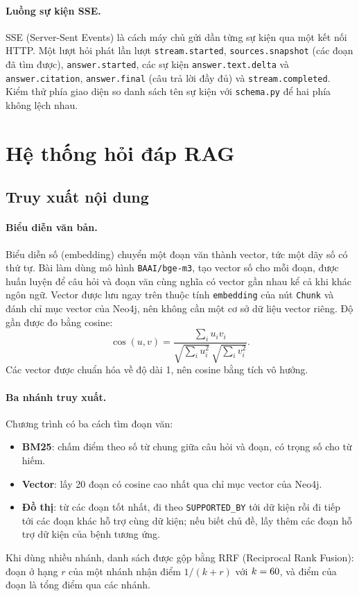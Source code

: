 \documentclass[11pt,a4paper]{article}
\begin{document}
\paragraph{Luồng sự kiện SSE.}
SSE (Server-Sent Events) là cách máy chủ gửi dần từng sự kiện qua một kết nối HTTP. Một lượt hỏi phát lần lượt
\texttt{stream.started}, \texttt{sources.snapshot} (các đoạn đã tìm được), \texttt{answer.started}, các sự kiện
\texttt{answer.text.delta} và \texttt{answer.citation}, \texttt{answer.final} (câu trả lời đầy đủ) và
\texttt{stream.completed}. Kiểm thử phía giao diện so danh sách tên sự kiện với \texttt{schema.py} để hai phía
không lệch nhau.

\section{Hệ thống hỏi đáp RAG}

\subsection{Truy xuất nội dung}

\paragraph{Biểu diễn văn bản.}
Biểu diễn số (embedding) chuyển một đoạn văn thành vector, tức một dãy số có thứ tự. Bài làm dùng mô hình
\texttt{BAAI/bge-m3}, tạo vector \embedDim{} số cho mỗi đoạn, được huấn luyện để câu hỏi và đoạn văn cùng nghĩa có
vector gần nhau kể cả khi khác ngôn ngữ. Vector được lưu ngay trên thuộc tính \texttt{embedding} của nút
\texttt{Chunk} và đánh chỉ mục vector của Neo4j, nên không cần một cơ sở dữ liệu vector riêng. Độ gần được đo
bằng cosine:
\[ \cos(u, v) = \frac{\sum_i u_i v_i}{\sqrt{\sum_i u_i^2}\,\sqrt{\sum_i v_i^2}}. \]
Các vector được chuẩn hóa về độ dài 1, nên cosine bằng tích vô hướng.

\paragraph{Ba nhánh truy xuất.}
Chương trình có ba cách tìm đoạn văn:
\begin{itemize}
  \item \textbf{BM25}: chấm điểm theo số từ chung giữa câu hỏi và đoạn, có trọng số cho từ hiếm.
  \item \textbf{Vector}: lấy 20 đoạn có cosine cao nhất qua chỉ mục vector của Neo4j.
  \item \textbf{Đồ thị}: từ các đoạn tốt nhất, đi theo \texttt{SUPPORTED\_BY} tới dữ kiện rồi đi tiếp tới các đoạn
        khác hỗ trợ cùng dữ kiện; nếu biết chủ đề, lấy thêm các đoạn hỗ trợ dữ kiện của bệnh tương ứng.
\end{itemize}
Khi dùng nhiều nhánh, danh sách được gộp bằng RRF (Reciprocal Rank Fusion): đoạn ở hạng $r$ của một nhánh nhận
điểm $1/(k + r)$ với $k = 60$, và điểm của đoạn là tổng điểm qua các nhánh.
\end{document}
